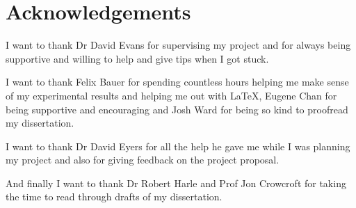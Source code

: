 \chapter{Acknowledgements}
I want to thank Dr David Evans for supervising my project and for always being supportive and willing to help and give tips when I got stuck.

I want to thank Felix Bauer for spending countless hours helping me make sense of my experimental results and helping me out with \LaTeX, Eugene Chan for being supportive and encouraging and Josh Ward for being so kind to proofread my dissertation.

I want to thank Dr David Eyers for all the help he gave me while I was planning my project and also for giving feedback on the project proposal.

And finally I want to thank Dr Robert Harle and Prof Jon Crowcroft for taking the time to read through drafts of my dissertation.
